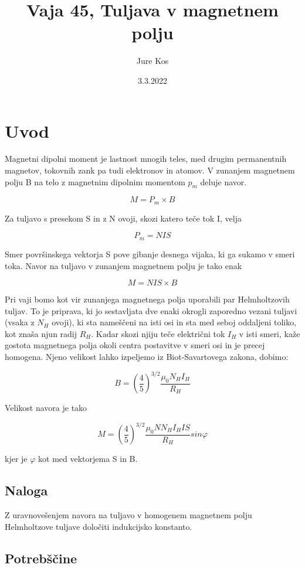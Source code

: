\documentclass[a4paper]{report}
\author{Jure Kos}
\title{Vaja 45, Tuljava v magnetnem polju}
\date{3.3.2022}
\begin{document}
\maketitle

\chapter*{Uvod}

Magnetni dipolni moment je lastnost mnogih teles, med drugim permanentnih magnetov, tokovnih zank pa tudi elektronov in atomov. V zunanjem magnetnem polju B na telo z magnetnim dipolnim momentom $p_m$ deluje navor.

\[M = P_m \times B\]

\noindent Za tuljavo s presekom S in z N ovoji, skozi katero teče tok I, velja

\[P_m = NIS\]

\noindent Smer površinskega vektorja S pove gibanje desnega vijaka, ki ga sukamo v smeri
toka. Navor na tuljavo v zunanjem magnetnem polju je tako enak

\[M = NIS \times B\]

\noindent Pri vaji bomo kot vir zunanjega magnetnega polja uporabili par Helmholtzovih
tuljav. To je priprava, ki jo sestavljata dve enaki okrogli zaporedno vezani tuljavi
(vsaka z $N_H$ ovoji), ki sta nameščeni na isti osi in sta med seboj oddaljeni toliko,
kot znaša njun radij $R_H$. Kadar skozi njiju teče električni tok $I_H$ v isti
smeri, kaže gostota magnetnega polja okoli centra postavitve v smeri osi in je precej
homogena. Njeno velikost lahko izpeljemo iz Biot-Savartovega zakona, dobimo:

\[B = \left( \frac{4}{5}\right)^{3/2} \frac{\mu_0N_HI_H}{R_H}\]

\noindent Velikost navora je tako

\[M = \left( \frac{4}{5}\right)^{3/2} \frac{\mu_0NN_HI_HIS}{R_H} sin\varphi\]

\noindent kjer je $\varphi$ kot med vektorjema S in B.

\section*{Naloga}

Z uravnovešenjem navora na tuljavo v homogenem magnetnem polju Helmholtzove
tuljave določiti indukcijsko konstanto.

\section*{Potrebščine}
\end{document}
